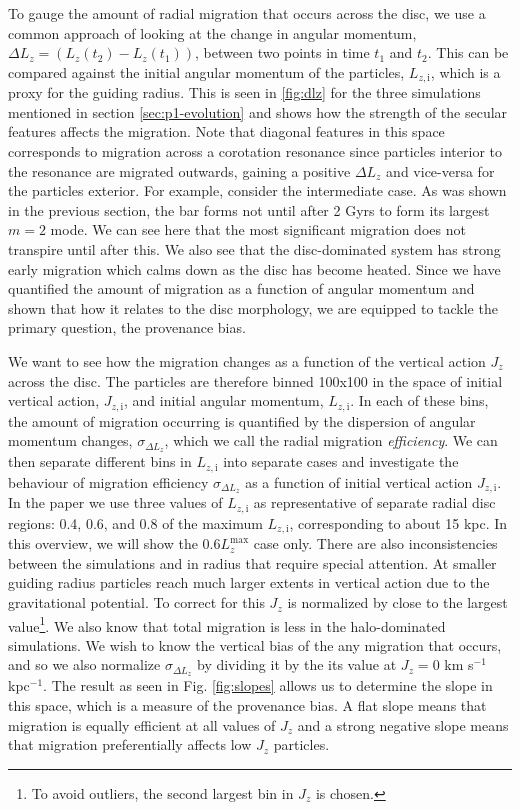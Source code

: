 To gauge the amount of radial migration that occurs across the disc, we use a common approach of looking at the change in angular momentum, $\Delta L_z = (L_z(t_2) - L_z(t_1))$, between two points in time $t_1$ and $t_2$. This can be compared against the initial angular momentum of the particles, $L_{z, \mathrm{i}}$, which is a proxy for the guiding radius. This is seen in \ref{fig:dlz} for the three simulations mentioned in section \ref{sec:p1-evolution} and shows how the strength of the secular features affects the migration. Note that diagonal features in this space corresponds to migration across a corotation resonance since particles interior to the resonance are migrated outwards, gaining a positive $\Delta L_z$ and vice-versa for the particles exterior. For example, consider the intermediate case. As was shown in the previous section, the bar forms not until after 2 Gyrs to form its largest $m=2$ mode. We can see here that the most significant migration does not transpire until after this. We also see that the disc-dominated system has strong early migration which calms down as the disc has become heated. Since we have quantified the amount of migration as a function of angular momentum and shown that how it relates to the disc morphology, we are equipped to tackle the primary question, the provenance bias.

We want to see how the migration changes as a function of the vertical action $J_z$ across the disc. The particles are therefore binned 100x100 in the space of initial vertical action, $J_{z, \mathrm{i}}$, and initial angular momentum, $L_{z, \mathrm{i}}$. In each of these bins, the amount of migration occurring is quantified by the dispersion of angular momentum changes, $\sigma_{\Delta L_z}$, which we call the radial migration \textit{efficiency}. We can then separate different bins in $L_{z, \mathrm{i}}$ into separate cases and investigate the behaviour of migration efficiency $\sigma_{\Delta L_z}$ as a function of initial vertical action $J_{z, \mathrm{i}}$. In the paper we use three values of $L_{z, \mathrm{i}}$ as representative of separate radial disc regions: 0.4, 0.6, and 0.8 of the maximum $L_{z, \mathrm{i}}$, corresponding to about 15 kpc. In this overview, we will show the $0.6 L_z^\mathrm{max}$ case only. There are also inconsistencies between the simulations and in radius that require special attention. At smaller guiding radius particles reach much larger extents in vertical action due to the gravitational potential. To correct for this $J_z$ is normalized by close to the largest value\footnote{To avoid outliers, the second largest bin in $J_z$ is chosen.}. We also know that total migration is less in the halo-dominated simulations. We wish to know the vertical bias of the any migration that occurs, and so we also normalize $\sigma_{\Delta L_z}$ by dividing it by the its value at $J_z = 0$ km s$^{-1}$ kpc$^{-1}$. The result as seen in Fig. \ref{fig:slopes} allows us to determine the slope in this space, which is a measure of the provenance bias. A flat slope means that migration is equally efficient at all values of $J_z$ and a strong negative slope means that migration preferentially affects low $J_z$ particles.

